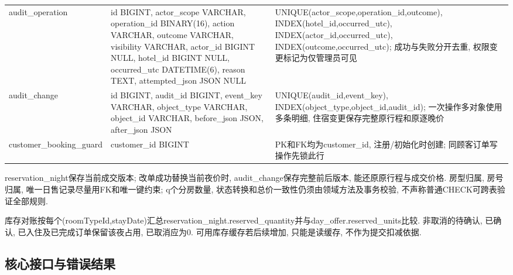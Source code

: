 \documentclass[cn,nofont,11pt,a4paper]{elegantpaper}
\begin{document}
\begin{longtable}{>{\RaggedRight\arraybackslash}p{}>{\RaggedRight\arraybackslash}p{}>{\RaggedRight\arraybackslash}p{}}
audit\_\allowbreak{}\allowbreak{}operation & id BIGINT, actor\_\allowbreak{}\allowbreak{}scope VARCHAR, operation\_\allowbreak{}\allowbreak{}id BINARY(16), action VARCHAR, outcome VARCHAR, visibility VARCHAR, actor\_\allowbreak{}\allowbreak{}id BIGINT NULL, hotel\_\allowbreak{}\allowbreak{}id BIGINT NULL, occurred\_\allowbreak{}\allowbreak{}utc DATETIME(6), reason TEXT, attempted\_\allowbreak{}\allowbreak{}json JSON NULL & UNIQUE(actor\_\allowbreak{}\allowbreak{}scope,operation\_\allowbreak{}\allowbreak{}id,outcome), INDEX(hotel\_\allowbreak{}\allowbreak{}id,occurred\_\allowbreak{}\allowbreak{}utc), INDEX(actor\_\allowbreak{}\allowbreak{}id,occurred\_\allowbreak{}\allowbreak{}utc), INDEX(outcome,occurred\_\allowbreak{}\allowbreak{}utc); 成功与失败分开去重, 权限变更标记为仅管理员可见 \\
audit\_\allowbreak{}\allowbreak{}change & id BIGINT, audit\_\allowbreak{}\allowbreak{}id BIGINT, event\_\allowbreak{}\allowbreak{}key VARCHAR, object\_\allowbreak{}\allowbreak{}type VARCHAR, object\_\allowbreak{}\allowbreak{}id VARCHAR, before\_\allowbreak{}\allowbreak{}json JSON, after\_\allowbreak{}\allowbreak{}json JSON & UNIQUE(audit\_\allowbreak{}\allowbreak{}id,event\_\allowbreak{}\allowbreak{}key), INDEX(object\_\allowbreak{}\allowbreak{}type,object\_\allowbreak{}\allowbreak{}id,audit\_\allowbreak{}\allowbreak{}id); 一次操作多对象使用多条明细, 住宿变更保存完整原行程和原逐晚价 \\
customer\_\allowbreak{}\allowbreak{}booking\_\allowbreak{}\allowbreak{}guard & customer\_\allowbreak{}\allowbreak{}id BIGINT & PK和FK均为customer\_\allowbreak{}\allowbreak{}id, 注册/\allowbreak{}初始化时创建; 同顾客订单写操作先锁此行 \\
\end{longtable}\endgroup
reservation\_\allowbreak{}night保存当前成交版本; 改单成功替换当前夜价时, audit\_\allowbreak{}change保存完整前后版本, 能还原原行程与成交价格. 房型归属, 房号归属, 唯一日售记录尽量用FK和唯一键约束; q个分房数量, 状态转换和总价一致性仍须由领域方法及事务校验, 不声称普通CHECK可跨表验证全部规则.

库存对账按每个(roomTypeId,stayDate)汇总reservation\_\allowbreak{}night.reserved\_\allowbreak{}quantity并与day\_\allowbreak{}offer.reserved\_\allowbreak{}units比较. 非取消的待确认, 已确认, 已入住及已完成订单保留该夜占用, 已取消应为0. 可用库存缓存若后续增加, 只能是读缓存, 不作为提交扣减依据.

\hypertarget{ux6838ux5fc3ux63a5ux53e3ux4e0eux9519ux8befux7ed3ux679c}{%
\subsection{核心接口与错误结果}\label{ux6838ux5fc3ux63a5ux53e3ux4e0eux9519ux8befux7ed3ux679c}}
\end{document}
